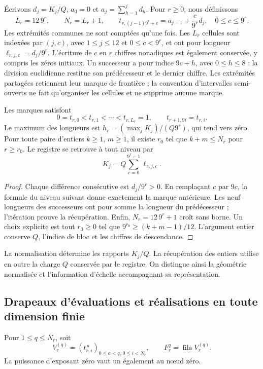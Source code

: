 Écrivons \(d_j=K_j/Q\), \(a_0=0\) et
\(a_j=\sum_{h=1}^j d_h\). Pour \(r\geq0\), nous définissons
\[
 L_r=12\,9^r,\qquad N_r=L_r+1,\qquad
 t_{r,(j-1)9^r+c}=a_{j-1}+\frac{c}{9^r}d_j,
 \quad 0\leq c\leq9^r.
\]
Les extrémités communes ne sont comptées qu'une fois. Les \(L_r\) cellules sont indexées par \((j,c)\), avec \(1\leq j\leq12\) et \(0\leq c<9^r\), et ont pour longueur \(\ell_{r,j,c}=d_j/9^r\). L'écriture de \(c\) en \(r\) chiffres nonadiques est également conservée, y compris les zéros initiaux. Un successeur a pour indice \(9c+h\), avec \(0\leq h\leq8\) ; la division euclidienne restitue son prédécesseur et le dernier chiffre. Les extrémités partagées retiennent leur marque de frontière ; la convention d'intervalles semi-ouverts ne fait qu'organiser les cellules et ne supprime aucune marque.

\begin{proposition}
\label{prop:dim-grid}
Les marques satisfont
\[
 0=t_{r,0}<t_{r,1}<\cdots<t_{r,L_r}=1,
 \qquad t_{r+1,9i}=t_{r,i}.
\]
Le maximum des longueurs est
\(h_r=(\max_jK_j)/(Q9^r)\), qui tend vers zéro. Pour toute paire
d’entiers \(k\geq1\), \(m\geq1\), il existe \(r_0\) tel que
\(k+m\leq N_r\) pour \(r\geq r_0\). Le registre se retrouve à
tout niveau par
\[
 K_j=Q\sum_{c=0}^{9^r-1}\ell_{r,j,c}.
\]
\end{proposition}
\begin{proof}
Chaque différence consécutive est \(d_j/9^r>0\). En remplaçant \(c\) par \(9c\), la formule du niveau suivant donne exactement la marque antérieure. Les neuf longueurs des successeurs ont pour somme la longueur du prédécesseur ; l'itération prouve la récupération. Enfin, \(N_r=12\,9^r+1\) croît sans borne. Un choix explicite est tout \(r_0\geq0\) tel que \(9^{r_0}\geq(k+m-1)/12\). L'argument entier conserve \(Q\), l'indice de bloc et les chiffres de descendance.
\end{proof}

La normalisation détermine les rapports \(K_j/Q\). La récupération des entiers utilise en outre la charge \(Q\) conservée par le registre. On distingue ainsi la géométrie normalisée et l'information d'échelle accompagnant sa représentation.

\subsection{Drapeaux d'évaluations et réalisations en toute dimension finie}

Pour \(1\leq q\leq N_r\), soit
\[
 V_r^{(q)}=(t_{r,i}^{\,a})_{0\leq a<q,\,0\leq i<N_r},
 \qquad F_r^q=\operatorname{fila}V_r^{(q)}.
\]
La puissance d’exposant zéro vaut un également au nœud zéro.

